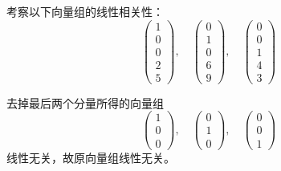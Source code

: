 \begin{frame}
\begin{li}
  考察以下向量组的线性相关性：
  $$
  \left(
  \begin{array}{c}
    1\\
    0\\
    0\\
    2\\
    5
  \end{array}
  \right), \quad
  \left(
  \begin{array}{c}
    0\\
    1\\
    0\\
    6\\
    9
  \end{array}
  \right), \quad
  \left(
  \begin{array}{c}
    0\\
    0\\
    1\\
    4\\
    3
  \end{array}
  \right)
  $$
\end{li} \pause 
\begin{jie}
去掉最后两个分量所得的向量组
$$
\left(
\begin{array}{c}
  1\\
  0\\
  0
\end{array}
\right), \quad
\left(
\begin{array}{c}
  0\\
  1\\
  0
\end{array}
\right), \quad
\left(
\begin{array}{c}
  0\\
  0\\
  1
\end{array}
\right)
$$
线性无关，故原向量组线性无关。
\end{jie}
\end{frame}


